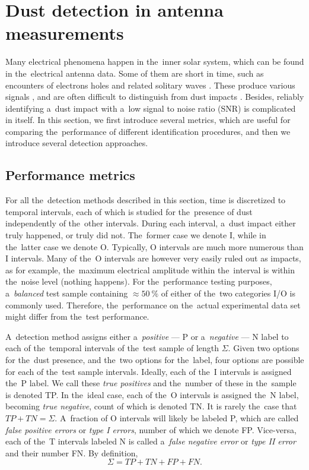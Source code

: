 \section{Dust detection in antenna measurements}

Many electrical phenomena happen in the~inner solar system, which can be found in the~electrical antenna data. Some of them are short in time, such as encounters of electrons holes and related solitary waves \citep{malaspina2013electrostatic,steinvall2019multispacecraft}. These produce various signals \citep{pickett2004solitary}, and are often difficult to distinguish from dust impacts \citep{malaspina2016database,vaverka2018comparison}. Besides, reliably identifying a~dust impact with a~low signal to noise ratio ({SNR}) is complicated in itself. In this section, we first introduce several metrics, which are useful for comparing the~performance of different identification procedures, and then we introduce several detection approaches.

\subsection{Performance metrics}

For all the~detection methods described in this section, time is discretized to temporal intervals, each of which is studied for the~presence of dust independently of the~other intervals. During each interval, a~dust impact either truly happened, or truly did not. The~former case we denote {I}, while in the~latter case we denote {O}. Typically, O intervals are much more numerous than I intervals. Many of the~O intervals are however very easily ruled out as impacts, as for example, the~maximum electrical amplitude within the~interval is within the~noise level (nothing happens). For the~performance testing purposes, a~\textit{balanced} test sample containing $\approx \SI{50}{\%}$ of either of the~two categories I/O is commonly used. Therefore, the~performance on the~actual experimental data set might differ from the~test performance.

A~detection method assigns either a~\textit{positive} --- P or a~\textit{negative} --- N label to each of the~temporal intervals of the~test sample of length $\Sigma$. Given two options for the~dust presence, and the~two options for the~label, four options are possible for each of the~test sample intervals. Ideally, each of the~I intervals is assigned the~P label. We call these \textit{true positives} and the~number of these in the~sample is denoted {TP}. In the~ideal case, each of the~O intervals is assigned the~N label, becoming \textit{true negative}, count of which is denoted {TN}. It is rarely the~case that $TP + TN = \Sigma$. A~fraction of O intervals will likely be labeled P, which are called \textit{false positive errors} or \textit{type I errors}, number of which we denote {FP}. Vice-versa, each of the~T intervals labeled N is called a~\textit{false negative error} or \textit{type II error} and their number {FN}. By definition,
\begin{equation}
    \Sigma = TP + TN + FP + FN.
\end{equation}

